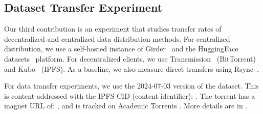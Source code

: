 \documentclass{article}
\newcommand{\cotwo}{\ensuremath{\mathrm{CO_2}}}
\begin{document}



\subsection{Dataset Transfer Experiment}

Our third contribution is an experiment that studies transfer rates of decentralized and centralized data
  distribution methods.
For centralized distribution, we use a self-hosted instance of Girder~\cite{girder_2024} and the HuggingFace
  datasets~\cite{huggingface_datasets} platform.
For decentralized clients, we use Transmission~\cite{transmission_2024} (BitTorrent) and
  Kubo~\cite{ipfskubo_2024} (IPFS).
As a baseline, we also measure direct transfers using Rsync~\cite{rsyncprojectrsync_2024}.

For data transfer experiments, we use the 2024-07-03 version of the dataset. 
This is content-addressed with the IPFS CID (content identifier):
\texttt{}.
The torrent has a magnet URL of:
\texttt{},
and is tracked on Academic Torrents \cite{academic_torrents_Cohen2014}.
More details are in .
\end{document}
